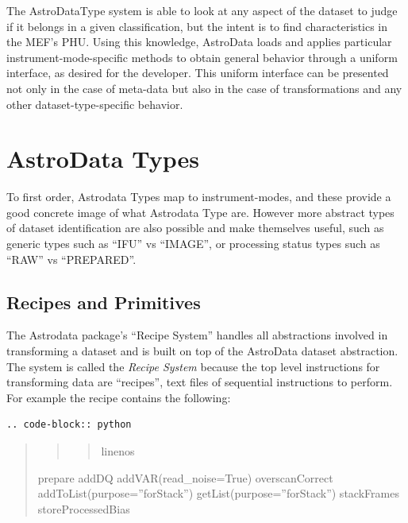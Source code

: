 \documentclass[letterpaper,10pt,english]{sphinxmanual}
\begin{document}
The AstroDataType system is able to look at any aspect of the dataset
to judge if it belongs in a given classification, but the intent is to
find characteristics in the MEF's PHU. Using this knowledge, AstroData
loads and applies particular instrument-mode-specific methods to
obtain general behavior through a uniform interface, as desired for
the developer. This uniform interface can be presented not only in the case
of meta-data but also in the case of transformations and any other
dataset-type-specific behavior.


\section{AstroData Types}
\label{gen.ADMANUAL_ADConcepts:astrodata-types}
To first order, Astrodata Types map to instrument-modes, and these
provide a good concrete image of what Astrodata Type are. However more
abstract types of dataset identification are also possible and make
themselves useful, such as generic types such as ``IFU'' vs ``IMAGE'', or
processing status types such as ``RAW'' vs ``PREPARED''.


\subsection{Recipes and Primitives}
\label{gen.ADMANUAL_ADConcepts:recipes-and-primitives}
The Astrodata package's ``Recipe System'' handles all abstractions
involved in transforming a dataset and is built on top of the
AstroData dataset abstraction. The system is called the \emph{Recipe
System} because the top level instructions for transforming data are
``recipes'', text files of sequential instructions to perform. For
example the recipe  contains the following:

\begin{Verbatim}[commandchars=\\\{\}]
.. code-block:: python
\end{Verbatim}
\begin{quote}
\begin{quote}
\begin{quote}\begin{description}
\item[{linenos}] \leavevmode
\end{description}\end{quote}
\end{quote}

prepare
addDQ
addVAR(read\_noise=True)
overscanCorrect
addToList(purpose=''forStack'')
getList(purpose=''forStack'')
stackFrames
storeProcessedBias
\end{quote}
\end{document}
